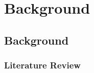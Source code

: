 \chapter[Background]{Background}

\label{Chap:Background}

\section{Background}


\subsection{Literature Review}